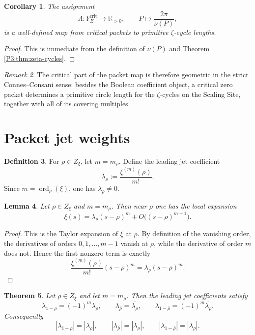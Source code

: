 \documentclass[11pt,a4paper]{article}
\numberwithin{equation}{section}
\newtheorem{theorem}{Theorem}[section]
\newtheorem{lemma}[theorem]{Lemma}
\newtheorem{corollary}[theorem]{Corollary}
\theoremstyle{definition}
\newtheorem{definition}[theorem]{Definition}
\theoremstyle{remark}
\newtheorem{remark}[theorem]{Remark}
\DeclareMathOperator{\ord}{ord}
\newcommand{\RR}{\mathbb R}
\begin{document}
\begin{corollary}\label{P3:cor:critical-map}
The assignment
\[
\Lambda:Y_E^{\mathrm{crit}}\longrightarrow \RR_{>0},
\qquad
P\longmapsto \frac{2\pi}{\nu(P)},
\]
is a well-defined map from critical packets to primitive $\zeta$-cycle lengths.
\end{corollary}

\begin{proof}
This is immediate from the definition of $\nu(P)$ and Theorem \ref{P3:thm:zeta-cycles}.
\end{proof}

\begin{remark}
The critical part of the packet map is therefore geometric in the strict Connes--Consani sense: besides the Boolean coefficient object, a critical zero packet determines a primitive circle length for the $\zeta$-cycles on the Scaling Site, together with all of its covering multiples.
\end{remark}

\section{Packet jet weights}

\begin{definition}
For $\rho\in Z_\xi$, let $m=m_\rho$.  Define the leading jet coefficient
\[
\lambda_\rho:=\frac{\xi^{(m)}(\rho)}{m!}.
\]
Since $m=\ord_\rho(\xi)$, one has $\lambda_\rho\ne 0$.
\end{definition}

\begin{lemma}\label{P3:lem:local-expansion}
Let $\rho\in Z_\xi$ and $m=m_\rho$.  Then near $\rho$ one has the local expansion
\[
\xi(s)=\lambda_\rho (s-\rho)^m + O\bigl((s-\rho)^{m+1}\bigr).
\]
\end{lemma}

\begin{proof}
This is the Taylor expansion of $\xi$ at $\rho$.  By definition of the vanishing order, the derivatives of orders $0,1,\dots,m-1$ vanish at $\rho$, while the derivative of order $m$ does not.  Hence the first nonzero term is exactly
\[
\frac{\xi^{(m)}(\rho)}{m!}(s-\rho)^m=\lambda_\rho (s-\rho)^m.
\]
\end{proof}

\begin{theorem}\label{P3:thm:lambda-transform}
Let $\rho\in Z_\xi$ and let $m=m_\rho$.  Then the leading jet coefficients satisfy
\[
\lambda_{1-\rho}=(-1)^m\lambda_\rho,
\qquad
\lambda_{\bar\rho}=\overline{\lambda_\rho},
\qquad
\lambda_{1-\bar\rho}=(-1)^m\overline{\lambda_\rho}.
\]
Consequently
\[
|\lambda_{1-\rho}|=|\lambda_{\rho}|,
\qquad
|\lambda_{\bar\rho}|=|\lambda_\rho|,
\qquad
|\lambda_{1-\bar\rho}|=|\lambda_\rho|.
\]
\end{theorem}
\end{document}
